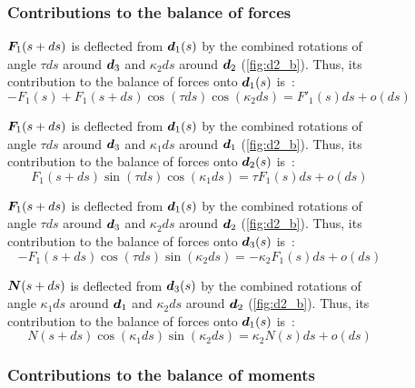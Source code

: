 \begin{figure}[p]
	\begin{fullpage}
	\subsubsection{Contributions to the balance of forces}
	\vspace{10pt}
	
	$\boldsymbol{F}_1(s+ds)$ is deflected from $\boldsymbol{d}_1(s)$ by the combined rotations of angle $\tau ds$ around $\boldsymbol{d}_3$ and $\kappa_2 ds$ around $\boldsymbol{d}_2$ (\cref{fig:d2_b}). Thus, its contribution to the balance of forces onto $\boldsymbol{d}_1(s)$ is~: 
	\begin{equation*}
		-F_1(s) + F_1(s+ds) \cos(\tau ds) \cos(\kappa_2 ds) = F'_1 (s) ds + o(ds)
	\end{equation*}
	
	$\boldsymbol{F}_1(s+ds)$ is deflected from $\boldsymbol{d}_1(s)$ by the combined rotations of angle $\tau ds$ around $\boldsymbol{d}_3$ and $\kappa_1 ds$ around $\boldsymbol{d}_1$ (\cref{fig:d2_b}). Thus, its contribution to the balance of forces onto $\boldsymbol{d}_2(s)$ is~: 
	\begin{equation*}
		F_1(s+ds) \sin(\tau ds) \cos(\kappa_1 ds) = \tau F_1 (s) ds + o(ds)
	\end{equation*}	
	
	$\boldsymbol{F}_1(s+ds)$ is deflected from $\boldsymbol{d}_1(s)$ by the combined rotations of angle $\tau ds$ around $\boldsymbol{d}_3$ and $\kappa_2 ds$ around $\boldsymbol{d}_2$ (\cref{fig:d2_b}). Thus, its contribution to the balance of forces onto $\boldsymbol{d}_3(s)$ is~: 
	\begin{equation*}
		-F_1(s+ds) \cos(\tau ds) \sin(\kappa_2 ds) = - \kappa_2 F_1(s) ds + o(ds)
	\end{equation*}	
	
	$\boldsymbol{N}(s+ds)$ is deflected from $\boldsymbol{d}_3(s)$ by the combined rotations of angle $\kappa_1 ds$ around $\boldsymbol{d}_1$ and $\kappa_2 ds$ around $\boldsymbol{d}_2$ (\cref{fig:d2_b}). Thus, its contribution to the balance of forces onto $\boldsymbol{d}_1(s)$ is~: 
	\begin{equation*}
		N(s+ds) \cos(\kappa_1 ds) \sin(\kappa_2 ds) = \kappa_2 N(s) ds + o(ds)
	\end{equation*}
	\vspace{10pt}

	\subsubsection{Contributions to the balance of moments}
	\vspace{10pt}
	

\end{fullpage}
\end{figure}
